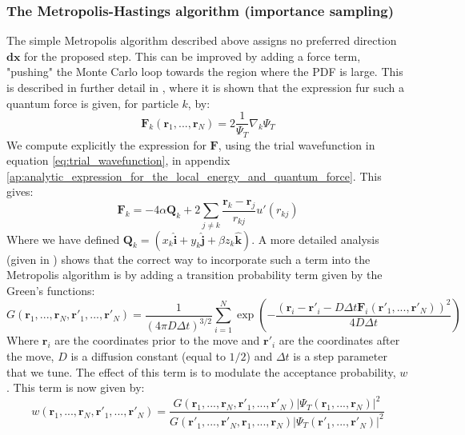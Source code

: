 \documentclass[a4paper, 10pt]{article}
\begin{document}
	\subsubsection{The Metropolis-Hastings algorithm (importance sampling)}\label{sec:Metropolis_Hasting_Sampling}
	The simple Metropolis algorithm described above assigns no preferred direction $\boldsymbol{dx}$ for the proposed step. This can be improved by adding a force term, "pushing" the Monte Carlo loop towards the region where the PDF is large. This is described in further detail in \cite{Hjorth-Jensen2015}, where it is shown that the expression fur such a quantum force is given, for particle $k$, by:
	\begin{equation}
	\boldsymbol{F}_k(\boldsymbol{r}_1, ..., \boldsymbol{r}_N)=2\frac{1}{\Psi_T}\nabla_k \Psi_T
	\end{equation}
	We compute explicitly the expression for $\boldsymbol{F}$, using the trial wavefunction in equation \ref{eq:trial_wavefunction}, in appendix \ref{ap:analytic_expression_for_the_local_energy_and_quantum_force}. This gives:
	\begin{equation}
	\boldsymbol{F}_k=	 -4\alpha\boldsymbol{Q}_{k} +
	2\sum_{j \neq k}\frac{\boldsymbol{r}_{k} - \boldsymbol{r}_{j}}{r_{kj}}u'(r_{kj})
	\end{equation}
	Where we have defined $\boldsymbol{Q}_{k} = \left(x_{k}\boldsymbol{\hat{i}} + y_{k}\boldsymbol{\hat{j}} + \beta z_{k}\boldsymbol{\hat{k}}\right)$.
	A more detailed analysis (given in \cite{Hjorth-Jensen2015}) shows that the correct way to incorporate such a term into the Metropolis algorithm is by adding a transition probability term given by the Green's functions:
	\begin{equation}\label{eq:Greens_Function}
	G(\boldsymbol{r}_1,...,\boldsymbol{r}_N,\boldsymbol{r'}_1,...,\boldsymbol{r'}_N)=\frac{1}{(4\pi D \Delta t)^{3/2}}\sum_{i=1}^N \exp \left(-\frac{(\boldsymbol{r}_i-\boldsymbol{r'}_i-D\Delta t\boldsymbol{F}_i(\boldsymbol{r}'_1,...,\boldsymbol{r}'_N))^2}{4D\Delta t}\right)
	\end{equation}
	Where $\boldsymbol{r}_i$ are the coordinates prior to the move and $\boldsymbol{r'}_i$ are the coordinates after the move, $D$ is a diffusion constant (equal to $1/2$) and $\Delta t$ is a step parameter that we tune. 
	The effect of this term is to modulate the acceptance probability, $w$. This term is now given by:
	\begin{equation}
	w(\boldsymbol{r}_1,...,\boldsymbol{r}_N,\boldsymbol{r'}_1,...,\boldsymbol{r'}_N)=\frac{G(\boldsymbol{r}_1,...,\boldsymbol{r}_N,\boldsymbol{r'}_1,...,\boldsymbol{r'}_N)|\Psi_T(\boldsymbol{r}_1,...,\boldsymbol{r}_N)|^2}{G(\boldsymbol{r'}_1,...,\boldsymbol{r'}_N,\boldsymbol{r}_1,...,\boldsymbol{r}_N)|\Psi_T(\boldsymbol{r'}_1,...,\boldsymbol{r'}_N)|^2}
	\end{equation}
\end{document}
